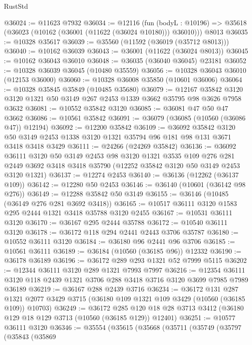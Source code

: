 \begin{lexlean}{RustStd}
\begin{coremodule}
@36024 := @11623 @7932
@36034 := @12116
    (fun (bodyL : @10196) => @35618 (@36023 (@10162 (@36001 (@11622 (@36024 @10180))) @36010)))
    @8013
@36035 := @10328 @35617
@36039 := @35560 (@11592 (@36019 (@35712 @8013)))
@36040 := @10162 @36039
@36043 := @36001 (@11622 (@36024 @8013))
@36045 := @10162 @36043 @36010
@36048 := @36035 (@36040 @36045) @23181
@36052 := @10328 @36039 @36045 (@10480 @35559)
@36056 := @10328 @36043 @36010 (@12153 @36000)
@36060 := @10328 @36008 @35850 (@10601 @36006)
@36064 := @10328 @35845 @35849 (@10485 @35680)
@36079 := @12167
    @35842
    @3120
    @3120
    @1321
    @50
    @3149
    @267
    @2453
    @1339
    @3662
    @35795
    @98
    @3626
    @7958
    @3632
@36081 := @10552 @35842 @3120
@36085 := @36081 @47 @50 @47 @3662
@36086 := @10561 @35842
@36091 := @36079 (@36085 (@10560 (@36086 @47)) @12194)
@36092 := @12200 @35842
@36109 := @36092
    @35842
    @3120
    @50
    @3149
    @2453
    @1338
    @3120
    @1321
    @35794
    @96
    @181
    @98
    @131
    @3671
    @3418
    @3418
    @3429
@36111 := @24266 (@24269 @35842)
@36136 := @36092
    @36111
    @3120
    @50
    @3149
    @2453
    @98
    @3120
    @1321
    @3535
    @109
    @276
    @281
    @2449
    @3692
    @3418
    @3418
    @35790
    (@12252 @35842 @3120 @50 @3149 @2453 @3120 @1321)
@36137 := @12274 @2453
@36140 := @36136 (@12262 (@36137 @109))
@36142 := @12280 @50 @2453
@36146 := @36140 (@10601 (@36142 @98 @276))
@36149 := @12288 @35842 @50 @3149
@36155 := @36146 (@10485 (@36149 @276 @281 @3692 @3418))
@36165 := @10517 @36111 @3120 @1583 @295 @2444 @1321 @3418 @35788 @3120 @2455
@36167 := @10531 @36111 @3120
@36170 := @36167 @295 @2444 @35788
@36172 := @10540 @36111 @3120
@36178 := @36172 @118 @294 @2441 @2443 @3706 @35787
@36180 := @10552 @36111 @3120
@36184 := @36180 @96 @2441 @96 @3706
@36185 := @10561 @36111
@36189 := @36184 (@10560 (@36185 @96)) @12332
@36190 := @36178 @36189
@36196 := @36172 @289 @293 @1321 @52 @7999 @5115
@36202 := @12344 @36111 @3120 @289 @1321 @7993 @7997
@36216 := @12354 @36111 @3120 @118 @2439 @1321 @3706 @288 @3418 @3716 @3120 @3699 @7985 @7989 @36189
@36219 := @36167 @288 @2439 @3716
@36234 := @36172
    @131
    @287
    @1321
    @2077
    @3429
    @3715
    (@36180 @109 @1321 @109 @3429 (@10560 (@36185 @109)) @10703)
@36249 := @36172
    @285
    @120
    @18
    @28
    @3713
    @3412
    (@36180 @129 @18 @129 @3713 (@10560 (@36185 @129)) @12401)
@36251 := @10577 @36111 @3120
@36346 := @35554
    (@35615
      (@35668
        (@35711
          (@35749
            (@35797
              (@35843
                (@35869

\end{coremodule}
\end{lexlean}
